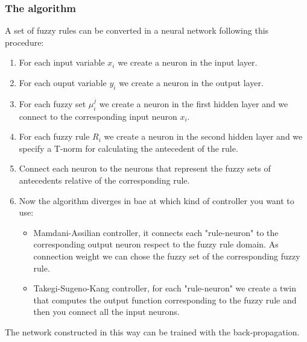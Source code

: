 \documentclass{article}
\begin{document}
\subsubsection{The algorithm}
A set of fuzzy rules can be converted in a neural network following this procedure:
\begin{enumerate}
    \item For each input variable $x_i$ we create a neuron in the input layer.
    \item For each ouput variable $y_i$ we create a neuron in the output layer.
    \item For each fuzzy set $\mu_i^j$ we create a neuron in the first hidden layer
          and we connect to the corresponding input neuron $x_i$.
    \item For each fuzzy rule $R_i$ we create a neuron in the second hidden layer
          and we specify a T-norm for calculating the antecedent of the rule.
    \item Connect each neuron to the neurons that represent the fuzzy sets of antecedents
          relative of the corresponding rule.
    \item Now the algorithm diverges in bae at which kind of controller you want to use:
          \begin{itemize}
              \item Mamdani-Assilian controller, it connects each "rule-neuron" to the corresponding
                    output neuron respect to the fuzzy rule domain. As connection weight we can chose
                    the fuzzy set of the corresponding fuzzy rule.
              \item Takegi-Sugeno-Kang controller, for each "rule-neuron" we create a twin that
                    computes the output function corresponding to the fuzzy rule and then you connect
                    all the input neurons.
          \end{itemize}
\end{enumerate}
The network constructed in this way can be trained with the back-propagation.
\end{document}

